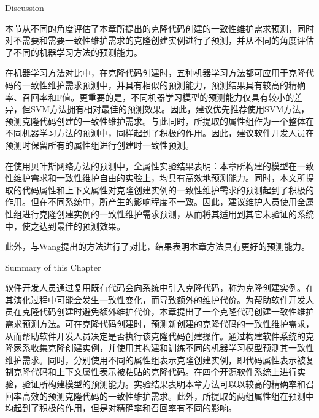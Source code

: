 {Discussion}

本节从不同的角度评估了本章所提出的克隆代码创建的一致性维护需求预测，同时对不需要和需要一致性维护需求的克隆创建实例进行了预测，并从不同的角度评估了不同的机器学习方法的预测能力。

在机器学习方法对比中，在克隆代码创建时，五种机器学习方法都可应用于克隆代码的一致性维护需求预测中，并具有相似的预测能力，预测结果具有较高的精确率、召回率和F值。更重要的是，不同机器学习模型的预测能力仅具有较小的差异，但SVM方法拥有相对最佳的预测效果。因此，建议优先推荐使用SVM方法，预测克隆代码创建的一致性维护需求。与此同时，所提取的属性组作为一个整体在不同机器学习方法的预测中，同样起到了积极的作用。因此，建议软件开发人员在预测时保留所有的属性组进行创建时一致性预测。

在使用贝叶斯网络方法的预测中，全属性实验结果表明：本章所构建的模型在一致性维护需求和一致性维护自由的实验上，均具有高效地预测能力。同时，本文所提取的代码属性和上下文属性对克隆创建实例的一致性维护需求的预测起到了积极的作用。但在不同系统中，所产生的影响程度不一致。因此，建议维护人员使用全属性组进行克隆创建实例的一致性维护需求预测，从而将其适用到其它未验证的系统中，使之达到最佳的预测效果。

此外，与Wang提出的方法进行了对比，结果表明本章方法具有更好的预测能力。

{Summary of this Chapter}

软件开发人员通过复用既有代码会向系统中引入克隆代码，称为克隆创建实例。在其演化过程中可能会发生一致性变化，而导致额外的维护代价。为帮助软件开发人员在克隆代码创建时避免额外维护代价，本章提出了一个克隆代码创建一致性维护需求预测方法。可在克隆代码创建时，预测新创建的克隆代码的一致性维护需求，从而帮助软件开发人员决定是否执行该克隆代码创建操作。通过构建软件系统的克隆家系收集克隆创建实例，并使用其构建和训练不同的机器学习模型预测其一致性维护需求。同时，分别使用不同的属性组表示克隆创建实例，即代码属性表示被复制克隆代码和上下文属性表示被粘贴的克隆代码。在四个开源软件系统上进行实验，验证所构建模型的预测能力。实验结果表明本章方法可以以较高的精确率和召回率高效的预测克隆代码的一致性维护需求。此外，所提取的两组属性组在预测中均起到了积极的作用，但是对精确率和召回率有不同的影响。



